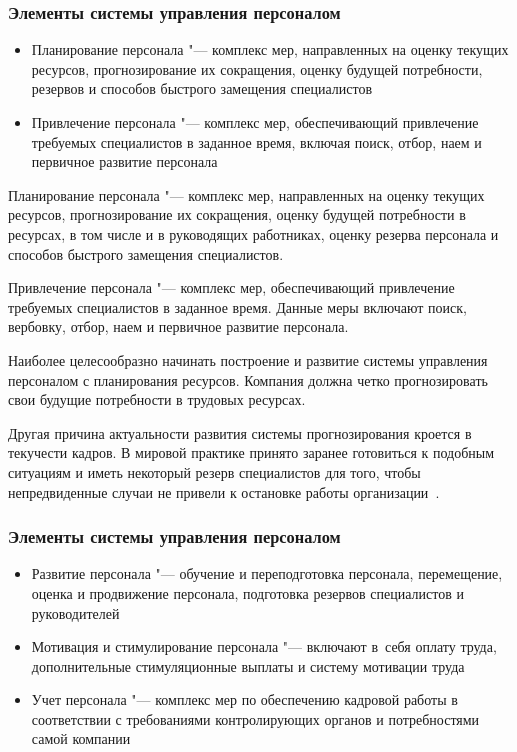 \documentclass{../industrial-development}
\begin{document}
\begin{frame} \frametitle{Элементы системы управления персоналом}

\begin{itemize}
\item Планирование персонала "--- комплекс мер, направленных на оценку текущих ресурсов, прогнозирование их сокращения, оценку будущей потребности, резервов и способов быстрого замещения специалистов
\item Привлечение персонала "--- комплекс мер, обеспечивающий привлечение требуемых специалистов в заданное время, включая поиск, отбор, наем и первичное развитие персонала
 \end{itemize}
\end{frame}

\lecturenotes

\alert{Планирование персонала} "--- комплекс мер, направленных на оценку текущих ресурсов, прогнозирование их сокращения, оценку будущей потребности в ресурсах, в том числе и в руководящих работниках, оценку резерва персонала и способов быстрого замещения специалистов.

\alert{Привлечение персонала} "--- комплекс мер, обеспечивающий привлечение требуемых специалистов в заданное время. Данные меры включают поиск, вербовку, отбор, наем и первичное развитие персонала.

Наиболее целесообразно начинать построение и развитие системы управления персоналом с планирования ресурсов. Компания должна четко прогнозировать свои будущие потребности в трудовых ресурсах. 

Другая причина актуальности развития системы прогнозирования кроется в текучести кадров. В мировой практике принято заранее готовиться к подобным ситуациям и иметь некоторый резерв специалистов для того, чтобы непредвиденные случаи не привели к остановке работы организации~\cite[с.~52]{Nelarin}.

\begin{frame} \frametitle{Элементы системы управления персоналом}
 \begin{itemize}
 \item Развитие персонала "--- обучение и переподготовка персонала, перемещение, оценка и продвижение персонала, подготовка резервов специалистов и руководителей 	 
				
	\item	Мотивация и стимулирование персонала "--- включают в~себя оплату труда, дополнительные стимуляционные выплаты и систему мотивации труда
			
	\item	Учет персонала "--- комплекс мер по обеспечению кадровой работы в соответствии с требованиями контролирующих органов и потребностями самой компании

 \end{itemize}
\end{frame}
\end{document}
